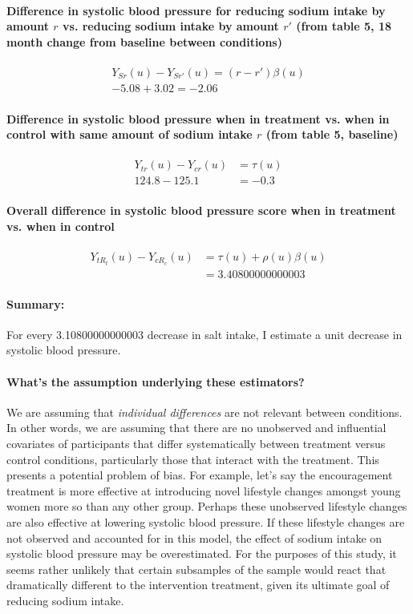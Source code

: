 \documentclass{article}
\begin{document}
\paragraph{Difference in systolic blood pressure for reducing sodium intake by amount $r$ vs. reducing sodium intake by amount $r'$ (from table 5, 18 month change from baseline between conditions)}

\begin{align*}
Y_{Sr}(u) - Y_{Sr'}(u) = (r-r')\beta(u)\\
-5.08 + 3.02 = -2.06
\end{align*}

\paragraph{Difference in systolic blood pressure when in treatment vs. when in control with same amount of sodium intake $r$ (from table 5, baseline)}

\begin{align*}
Y_{tr}(u) - Y_{cr}(u) &= \tau(u) \\
124.8 - 125.1 &= -0.3
\end{align*}

\paragraph{Overall difference in systolic blood pressure score when in treatment vs. when in control}
\begin{align*}
Y_{tR_{t}}(u) - Y_{cR_{c}}(u) &= \tau(u) + \rho(u)\beta(u)\\
&= 3.40800000000003 
\end{align*}

\paragraph{Summary: } For every 3.10800000000003 decrease in salt intake, I estimate a unit decrease in systolic blood pressure.

\paragraph{What's the assumption underlying these estimators?}
We are assuming that \emph{individual differences} are not relevant between conditions.  In other words, we are assuming that there are no unobserved and influential covariates of participants that differ systematically between treatment versus control conditions, particularly those that interact with the treatment.  This presents a potential problem of bias.  For example, let's say the encouragement treatment is more effective at introducing novel lifestyle changes amongst young women more so than any other group.  Perhaps these unobserved lifestyle changes are also effective at lowering systolic blood pressure.  If these lifestyle changes are not observed and accounted for in this model, the effect of sodium intake on systolic blood pressure may be overestimated.  For the purposes of this study, it seems rather unlikely that certain subsamples of the sample would react that dramatically different to the intervention treatment, given its ultimate goal of reducing sodium intake.  
\end{document}
